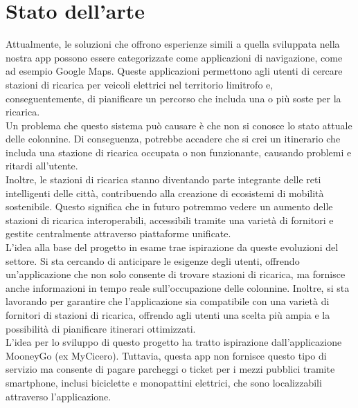 

\section{Stato dell'arte}

Attualmente, le soluzioni che offrono esperienze simili a quella sviluppata nella nostra app possono essere categorizzate
come applicazioni di navigazione, come ad esempio Google Maps.
Queste applicazioni permettono agli utenti di cercare stazioni di ricarica per veicoli elettrici nel territorio
limitrofo e, conseguentemente, di pianificare un percorso che includa una o più soste per la ricarica.\\

Un problema che questo sistema può causare è che non si conosce lo stato attuale delle colonnine. Di conseguenza,
potrebbe accadere che si crei un itinerario che includa una stazione di ricarica occupata o non funzionante,
causando problemi e ritardi all'utente.\\

Inoltre, le stazioni di ricarica stanno diventando parte integrante delle reti intelligenti delle città,
contribuendo alla creazione di ecosistemi di mobilità sostenibile. Questo significa che in futuro potremmo
vedere un aumento delle stazioni di ricarica interoperabili, accessibili tramite una varietà di fornitori
e gestite centralmente attraverso piattaforme unificate.\\

L'idea alla base del progetto in esame trae ispirazione da queste evoluzioni del settore. Si sta cercando
di anticipare le esigenze degli utenti, offrendo un'applicazione che non solo consente di trovare stazioni
di ricarica, ma fornisce anche informazioni in tempo reale sull'occupazione delle colonnine. Inoltre, si sta
lavorando per garantire che l'applicazione sia compatibile con una varietà di fornitori di stazioni di ricarica,
offrendo agli utenti una scelta più ampia e la possibilità di pianificare itinerari ottimizzati.\\

L'idea per lo sviluppo di questo progetto ha tratto ispirazione dall'applicazione MooneyGo (ex MyCicero). Tuttavia,
questa app non fornisce questo tipo di servizio ma consente di pagare parcheggi o ticket per i mezzi pubblici
tramite smartphone, inclusi biciclette e monopattini elettrici, che sono localizzabili attraverso l'applicazione.\\

